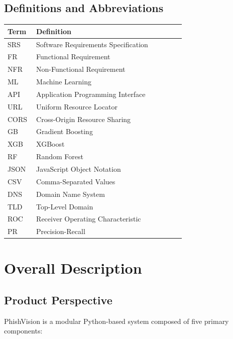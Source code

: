 \documentclass[12pt,a4paper]{report}
\begin{document}
\subsection{Definitions and Abbreviations}
\begin{longtable}{p{0.15\linewidth}p{0.78\linewidth}}
\toprule
\textbf{Term} & \textbf{Definition} \\
\midrule
SRS & Software Requirements Specification \\
FR & Functional Requirement \\
NFR & Non-Functional Requirement \\
ML & Machine Learning \\
API & Application Programming Interface \\
URL & Uniform Resource Locator \\
CORS & Cross-Origin Resource Sharing \\
GB & Gradient Boosting \\
XGB & XGBoost \\
RF & Random Forest \\
JSON & JavaScript Object Notation \\
CSV & Comma-Separated Values \\
DNS & Domain Name System \\
TLD & Top-Level Domain \\
ROC & Receiver Operating Characteristic \\
PR & Precision-Recall \\
\bottomrule
\end{longtable}

\section{Overall Description}

\subsection{Product Perspective}
PhishVision is a modular Python-based system composed of five primary components:
\end{document}
